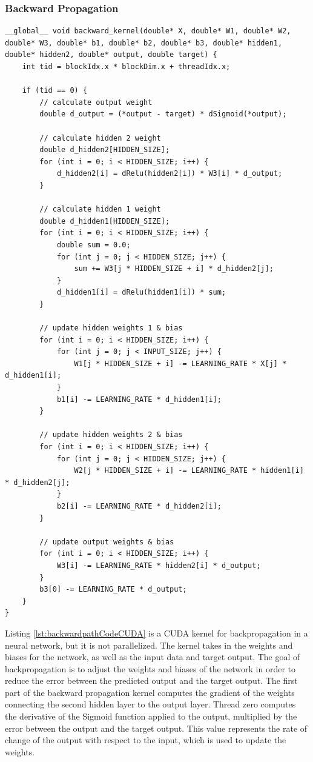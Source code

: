 \documentclass[11pt]{article}
\begin{document}
\subsubsection{Backward Propagation}
\begin{lstlisting}[style=CStyle, caption={Backward CUDA path of main.c}, label={lst:backwardpathCodeCUDA}]
__global__ void backward_kernel(double* X, double* W1, double* W2, double* W3, double* b1, double* b2, double* b3, double* hidden1, double* hidden2, double* output, double target) {
    int tid = blockIdx.x * blockDim.x + threadIdx.x;

    if (tid == 0) {
        // calculate output weight
        double d_output = (*output - target) * dSigmoid(*output);

        // calculate hidden 2 weight
        double d_hidden2[HIDDEN_SIZE];
        for (int i = 0; i < HIDDEN_SIZE; i++) {
            d_hidden2[i] = dRelu(hidden2[i]) * W3[i] * d_output;
        }
        
        // calculate hidden 1 weight
        double d_hidden1[HIDDEN_SIZE];
        for (int i = 0; i < HIDDEN_SIZE; i++) {
            double sum = 0.0;
            for (int j = 0; j < HIDDEN_SIZE; j++) {
                sum += W3[j * HIDDEN_SIZE + i] * d_hidden2[j];
            }
            d_hidden1[i] = dRelu(hidden1[i]) * sum;
        }

        // update hidden weights 1 & bias
        for (int i = 0; i < HIDDEN_SIZE; i++) {
            for (int j = 0; j < INPUT_SIZE; j++) {
                W1[j * HIDDEN_SIZE + i] -= LEARNING_RATE * X[j] * d_hidden1[i];
            }
            b1[i] -= LEARNING_RATE * d_hidden1[i];
        }

        // update hidden weights 2 & bias
        for (int i = 0; i < HIDDEN_SIZE; i++) {
            for (int j = 0; j < HIDDEN_SIZE; j++) {
                W2[j * HIDDEN_SIZE + i] -= LEARNING_RATE * hidden1[i] * d_hidden2[j];
            }
            b2[i] -= LEARNING_RATE * d_hidden2[i];
        }

        // update output weights & bias
        for (int i = 0; i < HIDDEN_SIZE; i++) {
            W3[i] -= LEARNING_RATE * hidden2[i] * d_output;
        }
        b3[0] -= LEARNING_RATE * d_output;
    }
}
\end{lstlisting}

Listing \ref{lst:backwardpathCodeCUDA} is a CUDA kernel for backpropagation in a neural network, but it is not parallelized. The kernel takes in the weights and biases for the network, as well as the input data and target output. The goal of backpropagation is to adjust the weights and biases of the network in order to reduce the error between the predicted output and the target output. The first part of the backward propagation kernel computes the gradient of the weights connecting the second hidden layer to the output layer. Thread zero computes the derivative of the Sigmoid function applied to the output, multiplied by the error between the output and the target output. This value represents the rate of change of the output with respect to the input, which is used to update the weights. 
\end{document}
